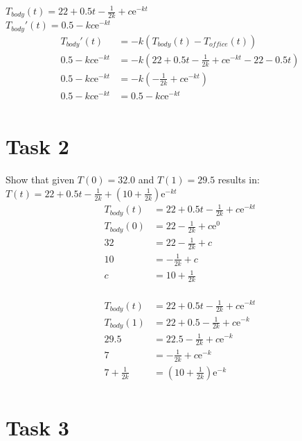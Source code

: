 \documentclass{article}
\begin{document}
  \noindent
  $T_{body}(t) = 22 + 0.5t - \frac{1}{2k} + c\mathrm{e}^{-kt}$ \\
  $T_{body}'(t) = 0.5 -kc\mathrm{e}^{-kt}$ \\

  \noindent
  \begin{align*}
    T_{body}'(t) &= -k(T_{body}(t) - T_{office}(t)) \\
    0.5 -kc\mathrm{e}^{-kt} &= -k(22 + 0.5t - \frac{1}{2k} + c\mathrm{e}^{-kt}
    - 22 - 0.5t) \\
    0.5 -kc\mathrm{e}^{-kt} &= -k(-\frac{1}{2k} + c\mathrm{e}^{-kt}) \\
    0.5 -kc\mathrm{e}^{-kt} &= 0.5 - kc\mathrm{e}^{-kt} \\
  \end{align*}


\section*{Task 2}

  Show that given $T(0) = 32.0$ and $T(1) = 29.5$ results in: \\
  $T(t) = 22 + 0.5t - \frac{1}{2k} + (10 + \frac{1}{2k})\mathrm{e}^{-kt}$ \\

  \noindent
  \begin{align*}
    T_{body}(t) &= 22 + 0.5t - \frac{1}{2k} + c\mathrm{e}^{-kt} \\
    T_{body}(0) &= 22 - \frac{1}{2k} + c\mathrm{e}^{0} \\
    32 &= 22 - \frac{1}{2k} + c \\
    10 &= -\frac{1}{2k} + c \\
    c  &= 10 + \frac{1}{2k} \\
  \end{align*}

  \begin{align*}
    T_{body}(t) &= 22 + 0.5t - \frac{1}{2k} + c\mathrm{e}^{-kt} \\
    T_{body}(1) &= 22 + 0.5 - \frac{1}{2k} + c\mathrm{e}^{-k} \\
    29.5 &= 22.5 - \frac{1}{2k} + c\mathrm{e}^{-k} \\
    7 &= - \frac{1}{2k} + c\mathrm{e}^{-k} \\
    7 + \frac{1}{2k} &= (10 + \frac{1}{2k})\mathrm{e}^{-k} \\
  \end{align*}

\section*{Task 3}
\end{document}
